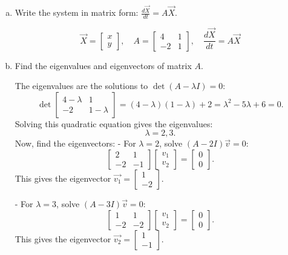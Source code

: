 \documentclass{article}
\begin{document}
\begin{enumerate}[a)]
  \item Write the system in matrix form: \( \frac{d\vec{X}}{dt} = A \vec{X} \).
  
  \[
  \vec{X} = \begin{bmatrix} x \\ y \end{bmatrix}, \quad A = \begin{bmatrix} 4 & 1 \\ -2 & 1 \end{bmatrix}, \quad \frac{d\vec{X}}{dt} = A \vec{X}
  \]

  \item Find the eigenvalues and eigenvectors of matrix \( A \).

  The eigenvalues are the solutions to \( \det(A - \lambda I) = 0 \):
  \[
  \det \begin{bmatrix} 4 - \lambda & 1 \\ -2 & 1 - \lambda \end{bmatrix} = (4 - \lambda)(1 - \lambda) + 2 = \lambda^2 - 5\lambda + 6 = 0.
  \]
  Solving this quadratic equation gives the eigenvalues:
  \[
  \lambda = 2, 3.
  \]
  Now, find the eigenvectors:
  - For \( \lambda = 2 \), solve \( (A - 2I)\vec{v} = 0 \):
  \[
  \begin{bmatrix} 2 & 1 \\ -2 & -1 \end{bmatrix} \begin{bmatrix} v_1 \\ v_2 \end{bmatrix} = \begin{bmatrix} 0 \\ 0 \end{bmatrix}.
  \]
  This gives the eigenvector \( \vec{v_1} = \begin{bmatrix} 1 \\ -2 \end{bmatrix} \).
  
  - For \( \lambda = 3 \), solve \( (A - 3I)\vec{v} = 0 \):
  \[
  \begin{bmatrix} 1 & 1 \\ -2 & -2 \end{bmatrix} \begin{bmatrix} v_1 \\ v_2 \end{bmatrix} = \begin{bmatrix} 0 \\ 0 \end{bmatrix}.
  \]
  This gives the eigenvector \( \vec{v_2} = \begin{bmatrix} 1 \\ -1 \end{bmatrix} \).


\end{enumerate}
\end{document}
